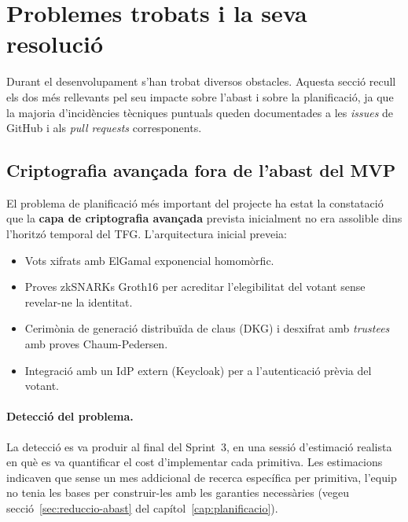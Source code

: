 \section{Problemes trobats i la seva resolució}
\label{sec:problemes}

Durant el desenvolupament s'han trobat diversos obstacles. Aquesta
secció recull els dos més rellevants pel seu impacte sobre l'abast i
sobre la planificació, ja que la majoria d'incidències tècniques
puntuals queden documentades a les \emph{issues} de GitHub i als
\emph{pull requests} corresponents.

\subsection{Criptografia avançada fora de l'abast del MVP}
\label{sec:criptografia-fora}

El problema de planificació més important del projecte ha estat la
constatació que la \textbf{capa de criptografia avançada} prevista
inicialment no era assolible dins l'horitzó temporal del \ac{TFG}.
L'arquitectura inicial preveia:

\begin{itemize}
    \item Vots xifrats amb ElGamal exponencial homomòrfic.
    \item Proves \acsp{zkSNARK} Groth16
    \cite{cortier2019belenios,adida2008helios} per acreditar
    l'elegibilitat del votant sense revelar-ne la identitat.
    \item Cerimònia de generació distribuïda de claus (DKG) i
    desxifrat amb \emph{trustees} amb proves Chaum-Pedersen.
    \item Integració amb un \ac{IdP} extern (Keycloak) per a
    l'autenticació prèvia del votant.
\end{itemize}

\paragraph{Detecció del problema.} La detecció es va produir al final
del Sprint~3, en una sessió d'estimació realista en què es va
quantificar el cost d'implementar cada primitiva. Les estimacions
indicaven que sense un mes addicional de recerca específica per
primitiva, l'equip no tenia les bases per construir-les amb les
garanties necessàries (vegeu
secció~\ref{sec:reduccio-abast} del
capítol~\ref{cap:planificacio}).

